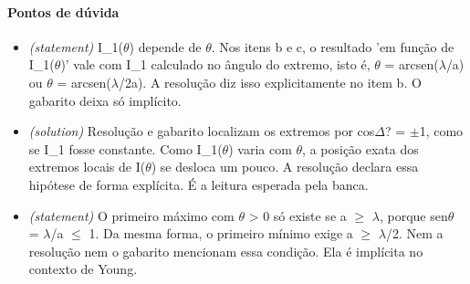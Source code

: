 \documentclass{article}%
\begin{document}
\paragraph{Pontos de dúvida}%
\begin{itemize}%
\item%
\textit{(statement)} I\_1($\theta$) depende de $\theta$. Nos itens b e c, o resultado 'em função de I\_1($\theta$)' vale com I\_1 calculado no ângulo do extremo, isto é, $\theta$ = arcsen($\lambda$/a) ou $\theta$ = arcsen($\lambda$/2a). A resolução diz isso explicitamente no item b. O gabarito deixa só implícito.%
\item%
\textit{(solution)} Resolução e gabarito localizam os extremos por cos$\Delta$? = $\pm$1, como se I\_1 fosse constante. Como I\_1($\theta$) varia com $\theta$, a posição exata dos extremos locais de I($\theta$) se desloca um pouco. A resolução declara essa hipótese de forma explícita. É a leitura esperada pela banca.%
\item%
\textit{(statement)} O primeiro máximo com $\theta$ > 0 só existe se a $\geq$ $\lambda$, porque sen$\theta$ = $\lambda$/a $\leq$ 1. Da mesma forma, o primeiro mínimo exige a $\geq$ $\lambda$/2. Nem a resolução nem o gabarito mencionam essa condição. Ela é implícita no contexto de Young.%
\end{itemize}%
\end{document}
